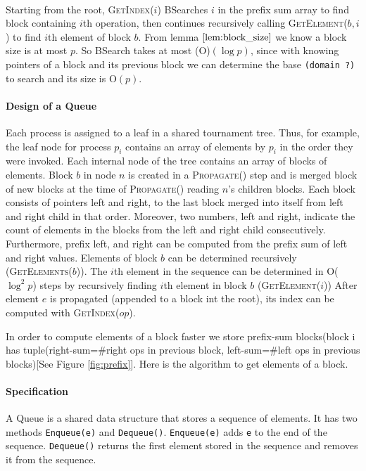 \documentclass[10pt]{article}
\theoremstyle{definition}
\begin{document}
\pagebreak

\paragraph{}
Starting from the root, \textsc{GetIndex}($i$) BSearches $i$ in the prefix sum array to find block containing $i$th operation, then continues recursively calling \textsc{GetElement}($b,i$) to find $i$th element of block $b$. From lemma $\ref{lem:block_size}$ we know a block size is at most $p$. So BSearch takes at most \textsc(O)$(\log p)$, since  with knowing pointers of a block and its previous block we can determine the base \texttt{(domain ?)} to search and its size is \textsc{O}$(p)$.


\paragraph{Design of a Queue}

Each process is assigned to a leaf in a shared tournament tree. Thus, for example, the leaf node for process $p_i$ contains an array of elements by $p_i$ in the order they were invoked.
Each internal node of the tree contains an array of blocks of elements.
Block $b$ in node $n$ is created in a \textsc{Propagate}() step and is merged block of new blocks at the time of \textsc{Propagate}() reading $n$'s children blocks. Each block consists of pointers left and right, to the last block merged into itself from left and right child in that order. Moreover, two numbers, left and right, indicate the count of elements in the blocks from the left and right child consecutively. Furthermore, prefix left, and right can be computed from the prefix sum of left and right values.
Elements of block $b$ can be determined recursively (\textsc{GetElements($b$)}).
The $i$th element in the sequence can be determined in \textsc{O}($\log^2 p$) steps by recursively finding $i$th element in block $b$ (\textsc{GetElement($i$)})
After element $e$ is propagated (appended to a block int the root), its index can be computed with \textsc{GetIndex}($op$).


In order to compute elements of a block faster we store prefix-sum blocks(block i has tuple(right-sum=$\#$right ops in previous block, left-sum=$\#$left ops in previous blocks)[See Figure \ref{fig:prefix}]. Here is the algorithm to get elements of a block.

\paragraph{Specification}
A Queue is a shared data structure that stores a sequence of elements. It has two methods \texttt{Enqueue(e)} and \texttt{Dequeue()}. \texttt{Enqueue(e)} adds \texttt{e} to the end of the sequence. \texttt{Dequeue()} returns the first element stored in the sequence and removes it from the sequence.
\end{document}
